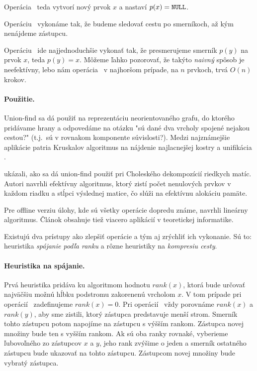 Operácia \makeset\ teda vytvorí nový prvok $x$ a nastaví $p(x) = \texttt{NULL}$. 

Operáciu \find\ vykonáme tak, že budeme sledovať cestu po smerníkoch, až 
kým nenájdeme zástupcu. 

Operáciu \union\ ide najjednoduchšie vykonať tak, že presmerujeme smerník 
$p(y)$ na prvok $x$, teda $p(y) = x$. 
Môžeme ľahko pozorovať, že takýto \emph{naivný} spôsob je neefektívny, 
lebo nám operácia \find\ v najhoršom prípade, na $n$ prvkoch, trvá $O(n)$ 
krokov. 

\paragraph{Použitie.}

Union-find sa dá použiť na reprezentáciu neorientovaného grafu,
do ktorého pridávame hrany a odpovedáme na otázku "sú dané dva
vrcholy spojené nejakou cestou?" (t.j.\ sú v rovnakom komponente súvislosti?).
Medzi najznámejšie aplikácie patria Kruskalov algoritmus na nájdenie najlacnejšej
kostry \citep{kruskal} a unifikácia \citep{unif}.

\citet{cholesky} ukázali, ako sa dá union-find použiť pri Choleského dekompozícií
riedkych matíc. Autori navrhli efektívny algoritmus, ktorý zistí počet nenulových
prvkov v každom riadku a stĺpci výslednej matice, čo slúži na efektívnu alokáciu
pamäte.

Pre offline verziu úlohy, kde sú všetky operácie dopredu známe, \citep{offline-uf}
navrhli lineárny algoritmus. Článok obsahuje tiež viacero aplikácií v teoretickej
informatike.

\smallskip
Existujú dva prístupy ako zlepšiť operácie a tým aj zrýchliť ich vykonanie. 
Sú to: heuristika \emph{spájanie podľa ranku} a rôzne heuristiky na 
\emph{kompresiu cesty}. 

\paragraph{Heuristika na spájanie.}

Prvá heuristika pridáva ku algoritmom hodnotu 
$rank(x)$, ktorá bude určovať najväčšiu možnú hĺbku podstromu zakorenenú 
vrcholom $x$. V tom prípade pri o\-pe\-rá\-cií \makeset\ zadefinujeme 
$rank(x) = 0$. 
Pri o\-pe\-rá\-cií \union\ vždy porovnáme $rank(x)$ a $rank(y)$, aby sme zistili, 
ktorý zástupca predstavuje menší strom. Smerník tohto zástupcu potom napojíme 
na zástupcu s výšším rankom. Zástupca novej množiny bude ten s vyšším rankom. 
Ak sú oba ranky rovnaké, vyberieme ľubovoľného zo zástupcov $x$ a $y$, 
jeho rank zvýšime o jeden a smerník ostatného zástupcu bude ukazovať 
na tohto zástupcu. Zástupcom novej množiny bude vybratý zástupca. 

